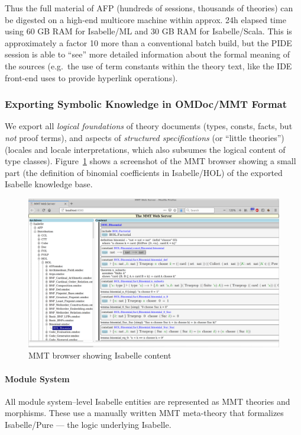 Thus the full material of AFP (hundreds of sessions, thousands of theories) can be digested on a high-end multicore machine within
approx. 24h elapsed time using 60 GB RAM for Isabelle/ML and 30 GB RAM for Isabelle/Scala.
This is approximately a factor 10 more than a conventional batch build, but the PIDE session is able to ``see'' more detailed information about the formal meaning of the sources (e.g.\ the use of term constants within the theory text, like the IDE front-end uses to provide hyperlink operations).

\subsubsection{Exporting Symbolic Knowledge in OMDoc/MMT Format}

We export all \emph{logical foundations} of theory documents (types, consts, facts, but \emph{not} proof terms), and aspects of \emph{structured specifications} (or ``little theories'') (locales and locale interpretations, which also subsumes the logical content of type classes).
Figure~\ref{fig:isabellemmt} shows a screenshot of the MMT browser showing a small part (the definition of binomial coefficients in Isabelle/HOL) of the exported Isabelle knowledge base.

\begin{figure}[ht]
  \includegraphics[width=\textwidth]{isabelle_mmt}
  \caption{MMT browser showing Isabelle content}\label{fig:isabellemmt}
\end{figure}

\paragraph{Module System}
All module system--level Isabelle entities are represented as MMT theories and morphisms.
These use a manually written MMT meta-theory that formalizes Isabelle/Pure --- the logic underlying Isabelle.

